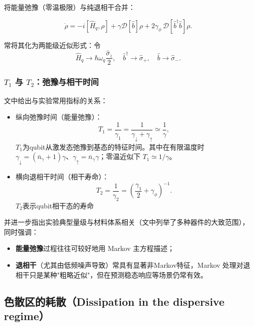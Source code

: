 \documentclass[12pt,a4paper,oneside]{ctexbook}
\begin{document}
将能量弛豫（零温极限）与纯退相干合并：

\begin{equation}
\dot\rho=-i[\hat H_q,\rho]+\gamma\mathcal D[\hat b]\rho
+2\gamma_\phi\,\mathcal D[\hat b^\dagger \hat b]\rho.
\tag{79}
\end{equation}

常将其化为两能级近似形式：令
\begin{equation}
\hat H_q \to \hbar\omega_q\frac{\hat\sigma_z}{2},\quad
\hat b^\dagger \to \hat\sigma_+,\quad
\hat b \to \hat\sigma_-.
\end{equation}

\subsubsection{$T_1$ 与 $T_2$：弛豫与相干时间}

文中给出与实验常用指标的关系：
\begin{itemize}
  \item 纵向弛豫时间（能量弛豫）：
  \begin{equation}
  T_1=\frac{1}{\gamma_1}=\frac{1}{\gamma_\downarrow+\gamma_\uparrow}\simeq \frac{1}{\gamma},
  \tag{80a}
  \end{equation}
  $T_1$为qubit从激发态弛豫到基态的特征时间。其中在有限温度时 $\gamma_\downarrow=(\bar n_\gamma+1)\gamma$、$\gamma_\uparrow=\bar n_\gamma\gamma$；零温近似下 $T_1\simeq 1/\gamma$。
  \item 横向退相干时间（相干寿命）：
  \begin{equation}
  T_2=\frac{1}{\gamma_2}=\left(\frac{\gamma_1}{2}+\gamma_\phi\right)^{-1}.
  \tag{80b}
  \end{equation}
  $T_2$表示qubit相干态的寿命
\end{itemize}

并进一步指出实验典型量级与材料体系相关（文中列举了多种器件的大致范围），同时强调：
\begin{itemize}
  \item \textbf{能量弛豫}过程往往可较好地用 Markov 主方程描述；
  \item \textbf{退相干}（尤其由低频噪声导致）常具有显著非Markov特征，Markov 处理对退相干只是某种"粗略近似"，但在预测稳态响应等场景仍常有效。
\end{itemize}


\subsection{色散区的耗散（Dissipation in the dispersive regime）}
\end{document}
